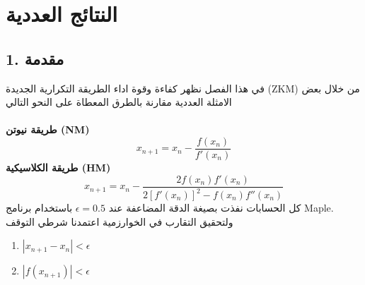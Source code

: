 \chapter{النتائج العددية}

\section*{1. مقدمة}

في هذا الفصل نظهر كفاءة وقوة اداء الطريقة التكرارية الجديدة (ZKM) من خلال بعض الامثلة العددية مقارنة بالطرق المعطاة على النحو التالي\\ \\
\textbf{طريقة نيوتن (NM)}
\[
x_{n+1} = x_n - \frac{f(x_n)}{f'(x_n)}
\]
\textbf{طريقة الكلاسيكية (HM)}
\[
x_{n+1} = x_n - \frac{2f(x_n) f'(x_n)}{2[f'(x_n)]^2 - f(x_n )f''(x_n)}
\]
كل الحسابات نفذت بصيغة الدقة المضاعفة عند $\epsilon = 0.5$ باستخدام برنامج Maple. ولتحقيق التقارب في الخوارزمية اعتمدنا شرطي التوقف
\begin{enumerate}
	\item $|x_{n+1}-x_n|<\epsilon$
	\item $|f(x_{n+1})|<\epsilon$
\end{enumerate}
\newpage

